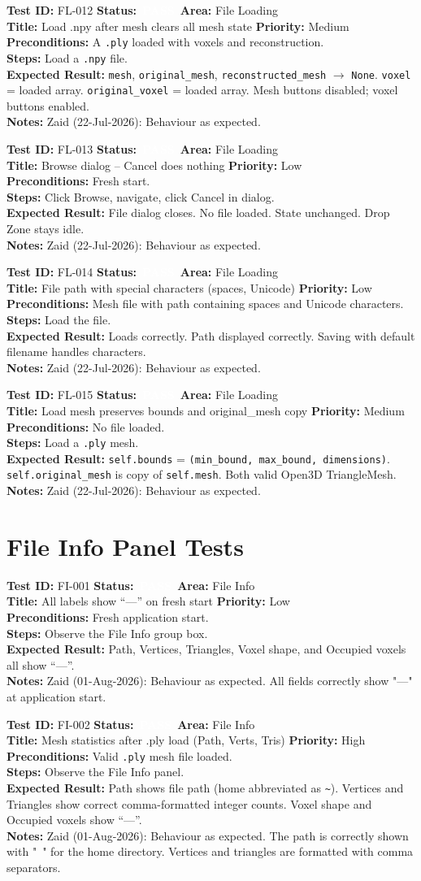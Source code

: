 \documentclass[12pt,a4paper]{article}
\newcommand{\statuspass}{\colorbox{statusgreen}{\textcolor{white}{\textbf{\,PASS\,}}}}
\newcommand{\testcase}[9]{%
  \smallskip
  \noindent\textbf{Test ID:} #1 \hfill \textbf{Status:} #2 \hfill \textbf{Area:} #3 \\
  \textbf{Title:} #4 \hfill \textbf{Priority:} #5 \\[0.3em]
  \textbf{Preconditions:} #6 \\[0.3em]
  \textbf{Steps:} #7 \\[0.3em]
  \textbf{Expected Result:} #8 \\
  \textbf{Notes:} #9
  \smallskip
}
\begin{document}
\testcase{FL-012}{\statuspass}{File Loading}{Load .npy after mesh clears all mesh state}{Medium}{A \texttt{.ply} loaded with voxels and reconstruction.}{Load a \texttt{.npy} file.}{\texttt{mesh}, \texttt{original\_mesh}, \texttt{reconstructed\_mesh} $\rightarrow$ \texttt{None}. \texttt{voxel} = loaded array. \texttt{original\_voxel} = loaded array. Mesh buttons disabled; voxel buttons enabled.}{Zaid (22-Jul-2026): Behaviour as expected.}


\testcase{FL-013}{\statuspass}{File Loading}{Browse dialog -- Cancel does nothing}{Low}{Fresh start.}{Click Browse, navigate, click Cancel in dialog.}{File dialog closes. No file loaded. State unchanged. Drop Zone stays idle.}{Zaid (22-Jul-2026): Behaviour as expected.}


\testcase{FL-014}{\statuspass}{File Loading}{File path with special characters (spaces, Unicode)}{Low}{Mesh file with path containing spaces and Unicode characters.}{Load the file.}{Loads correctly. Path displayed correctly. Saving with default filename handles characters.}{Zaid (22-Jul-2026): Behaviour as expected.}


\testcase{FL-015}{\statuspass}{File Loading}{Load mesh preserves bounds and original\_mesh copy}{Medium}{No file loaded.}{Load a \texttt{.ply} mesh.}{\texttt{self.bounds} = \texttt{(min\_bound, max\_bound, dimensions)}. \texttt{self.original\_mesh} is copy of \texttt{self.mesh}. Both valid Open3D TriangleMesh.}{Zaid (22-Jul-2026): Behaviour as expected.}



\section{File Info Panel Tests}

\testcase{FI-001}{\statuspass}{File Info}{All labels show ``---'' on fresh start}{Low}{Fresh application start.}{Observe the File Info group box.}{Path, Vertices, Triangles, Voxel shape, and Occupied voxels all show ``---''.}{Zaid (01-Aug-2026): Behaviour as expected. All fields correctly show "---" at application start.}


\testcase{FI-002}{\statuspass}{File Info}{Mesh statistics after .ply load (Path, Verts, Tris)}{High}{Valid \texttt{.ply} mesh file loaded.}{Observe the File Info panel.}{Path shows file path (home abbreviated as \texttt{\~{}}). Vertices and Triangles show correct comma-formatted integer counts. Voxel shape and Occupied voxels show ``---''.}{Zaid (01-Aug-2026): Behaviour as expected. The path is correctly shown with "~" for the home directory. Vertices and triangles are formatted with comma separators.}
\end{document}
